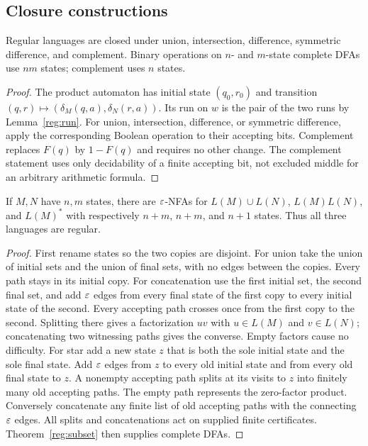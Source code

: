 \subsection{Closure constructions}

\begin{theorem}\label{reg:boolean}
Regular languages are closed under union, intersection, difference,
symmetric difference, and complement.  Binary operations on $n$- and
$m$-state complete DFAs use $nm$ states; complement uses $n$ states.
\end{theorem}
\begin{proof}
The product automaton has initial state $(q_0,r_0)$ and transition
$(q,r)\mapsto(\delta_M(q,a),\delta_N(r,a))$.  Its run on $w$ is the pair
of the two runs by Lemma~\ref{reg:run}.  For union, intersection,
difference, or symmetric difference, apply the corresponding Boolean
operation to their accepting bits.  Complement replaces $F(q)$ by
$1-F(q)$ and requires no other change.  The complement statement uses
only decidability of a finite accepting bit, not excluded middle for an
arbitrary arithmetic formula.
\end{proof}

\begin{theorem}\label{reg:concatstar}
If $M,N$ have $n,m$ states, there are $\varepsilon$-NFAs for
$L(M)\cup L(N)$, $L(M)L(N)$, and $L(M)^*$ with respectively
$n+m$, $n+m$, and $n+1$ states.  Thus all three languages are regular.
\end{theorem}
\begin{proof}
First rename states so the two copies are disjoint.  For union take the
union of initial sets and the union of final sets, with no edges between
the copies.  Every path stays in its initial copy.
For concatenation use the first initial set, the second final set, and add
$\varepsilon$ edges from every final state of the first copy to every initial
state of the second.  Every accepting path crosses once from the first
copy to the second.  Splitting there gives a factorization $uv$ with
$u\in L(M)$ and $v\in L(N)$; concatenating two witnessing paths gives the
converse.  Empty factors cause no difficulty.
For star add a new state $z$ that is both the sole initial state and the
sole final state.  Add $\varepsilon$ edges from $z$ to every old initial state
and from every old final state to $z$.  A nonempty accepting path splits
at its visits to $z$ into finitely many old accepting paths.  The empty
path represents the zero-factor product.  Conversely concatenate any
finite list of old accepting paths with the connecting $\varepsilon$ edges.
All splits and concatenations act on supplied finite certificates.
Theorem~\ref{reg:subset} then supplies complete DFAs.
\end{proof}

